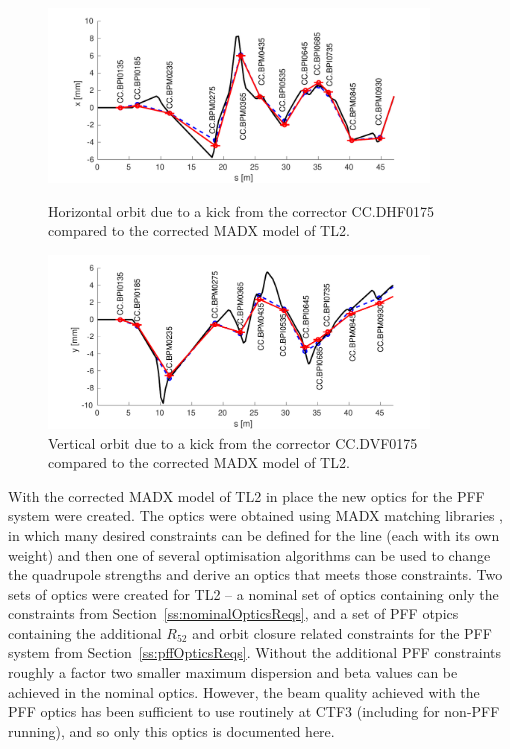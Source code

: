 \begin{figure}
  \centering
  \includegraphics[width=0.9\textwidth]{Figures/optics/modelCorrectedH}
  \caption{Horizontal orbit due to a kick from the corrector CC.DHF0175 compared to the corrected MADX model of TL2.}
  \label{f:modelCorrectedH}
  \includegraphics[width=0.9\textwidth]{Figures/optics/modelCorrectedV}
  \caption{Vertical orbit due to a kick from the corrector CC.DVF0175 compared to the corrected MADX model of TL2.}
  \label{f:modelCorrectedV}
\end{figure}


With the corrected MADX model of TL2 in place the new optics for the PFF system were created. The optics were obtained using MADX matching libraries \cite{madx}, in which many desired constraints can be defined for the line (each with its own weight) and then one of several optimisation algorithms can be used to change the quadrupole strengths and derive an optics that meets those constraints. Two sets of optics were created for TL2 -- a nominal set of optics containing only the constraints from Section~\ref{ss:nominalOpticsReqs}, and a set of PFF otpics containing the additional \(R_{52}\) and orbit closure related constraints for the PFF system from Section~\ref{ss:pffOpticsReqs}. Without the additional PFF constraints roughly a factor two smaller maximum dispersion and beta values can be achieved in the nominal optics. However, the beam quality achieved with the PFF optics has been sufficient to use routinely at CTF3 (including for non-PFF running), and so only this optics is documented here.


